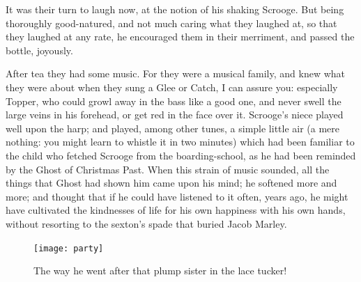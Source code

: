 \documentclass[paper=5.5in:8.5in,BCOR=7mm,twoside,DIV=calc,12pt,usegeometry]{scrbook} %
\begin{document}
It was their turn to laugh now, at the notion of his shaking Scrooge. But being thoroughly good-natured, and not much car\-ing what they laughed at, so that they laughed at any rate, he encouraged them in their merriment, and passed the bottle, joyously.

After tea they had some music. For they were a musical family, and knew what they were about when they sung a Glee or Catch, I can assure you: especially Topper, who could growl away in the bass like a good one, and never swell the large veins in his forehead, or get red in the face over it. Scrooge's niece played well upon the harp; and played, among other tunes, a simple little air (a mere nothing: you might learn to whistle it in two minutes) which had been familiar to the child who fetched Scrooge from the boarding-school, as he had been reminded by the Ghost of Christmas Past. When this strain of music sounded, all the things that Ghost had shown him came upon his mind; he softened more and more; and thought that if he could have listened to it often, years ago, he might have cultivated the kindnesses of life for his own happiness with his own hands, without resorting to the sexton's spade that buried Jacob Marley.

\begin{figure}[p]
\begin{minipage}[c]{\linewidth}
\texttt{[image: party]}
\caption[The way he went after that plump sister in the lace tucker!]{The way he went after that plump sister in the lace tucker!}
\end{minipage}
\end{figure}
\end{document}
